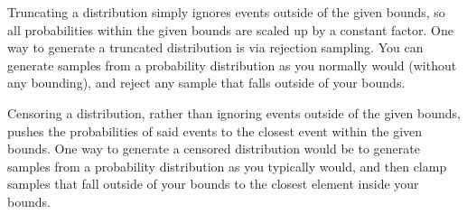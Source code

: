 \documentclass[11pt]{scrartcl} %
\begin{document}
Truncating a distribution simply ignores events outside of the given bounds, so
all probabilities within the given bounds are scaled up by a constant factor.
One way to generate a truncated distribution is via rejection sampling.
You can generate samples from a probability distribution as you normally would (without any bounding),
and reject any sample that falls outside of your bounds. \newline

Censoring a distribution, rather than ignoring events outside of the given bounds, pushes the
probabilities of said events to the closest event within the given bounds. One way to generate
a censored distribution would be to generate samples from a probability distribution as you
typically would, and then clamp samples that fall outside of your bounds to the closest element
inside your bounds.





\end{document}
